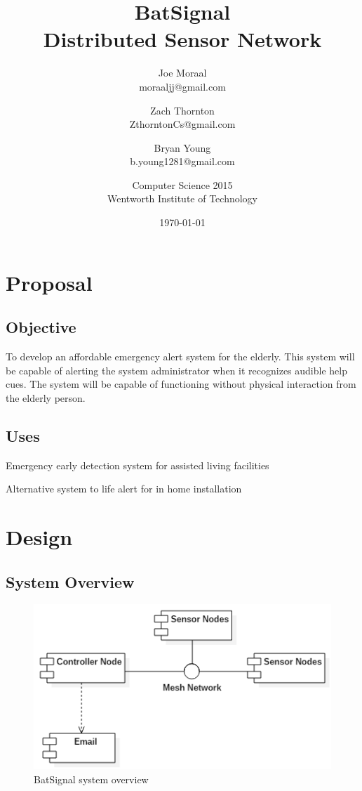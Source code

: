 \documentclass[11pt,a4paper]{article}
\begin{document}
\title{BatSignal \\ Distributed Sensor Network}
\author{
	Joe Moraal\\moraaljj@gmail.com\\ \and
	Zach Thornton\\ZthorntonCs@gmail.com\and
    Bryan Young\\b.young1281@gmail.com\and
	Computer Science 2015 \\
	Wentworth Institute of Technology
}
\date{\today}

\maketitle
\newpage

\tableofcontents{}
\newpage

\section{Proposal}
\subsection{Objective}
To develop an affordable emergency alert system for the elderly. This system will be
capable of alerting the system administrator when it recognizes audible help cues. The system
will be capable of functioning without physical interaction from the elderly person.

\subsection{Uses}
\begin{list}{-}{}
	\item{Emergency early detection system for assisted living facilities}
	\item{Alternative system to life alert for in home installation}
\end{list}

\section{Design}
\subsection{System Overview}
\begin{figure}[H]
	\centering
	\includegraphics[scale=0.75, keepaspectratio=true]{Graphics/SimpleOverview.png}
	\caption{BatSignal system overview}
\end{figure}
\end{document}
